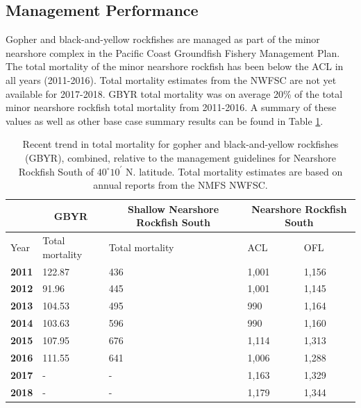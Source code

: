 \documentclass[12pt,]{article}
\begin{document}
\FloatBarrier

\subsection*{Management Performance}\label{management-performance}

Gopher and black-and-yellow rockfishes are managed as part of the minor
nearshore complex in the Pacific Coast Groundfish Fishery Management
Plan. The total mortality of the minor nearshore rockfish has been below
the ACL in all years (2011-2016). Total mortality estimates from the
NWFSC are not yet available for 2017-2018. GBYR total mortality was on
average 20\% of the total minor nearshore rockfish total mortality from
2011-2016. A summary of these values as well as other base case summary
results can be found in Table \ref{tab:mnmgt_perform}.

\begin{table}[ht]
\centering
\caption{Recent trend in total mortality for gopher and 
                            black-and-yellow rockfishes (GBYR), combined, relative to the 
                             management guidelines for Nearshore Rockfish 
                             South of $40^\circ 10^\prime$ N. latitude. 
                             Total mortality estimates are based on annual reports 
                                from the NMFS NWFSC.} 
\label{tab:mnmgt_perform}
\begin{tabular}{lllll}
  \hline
   \multicolumn{1}{c}{} & \multicolumn{1}{c}{GBYR} & \multicolumn{1}{c}{Shallow Nearshore Rockfish South} & \multicolumn{2}{c}{Nearshore Rockfish South} \\  \cmidrule(lr){2-2} \cmidrule(lr){3-3} \cmidrule(lr){4-5}
   \hline
Year & Total mortality & Total mortality & ACL & OFL \\ 
  \hline
\textbf{2011} & 122.87 & 436 & 1,001 & 1,156 \\ 
  \textbf{2012} & 91.96 & 445 & 1,001 & 1,145 \\ 
  \textbf{2013} & 104.53 & 495 & 990 & 1,164 \\ 
  \textbf{2014} & 103.63 & 596 & 990 & 1,160 \\ 
  \textbf{2015} & 107.95 & 676 & 1,114 & 1,313 \\ 
  \textbf{2016} & 111.55 & 641 & 1,006 & 1,288 \\ 
  \textbf{2017} & - & - & 1,163 & 1,329 \\ 
  \textbf{2018} & - & - & 1,179 & 1,344 \\ 
   \hline
   \hline
\end{tabular}
\end{table}
\end{document}
